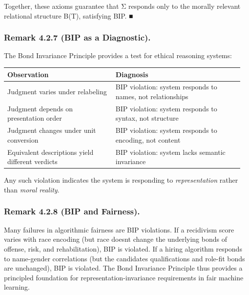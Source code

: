 \documentclass[12pt]{article}
\theoremstyle{plain}
\theoremstyle{definition}
\theoremstyle{remark}
\begin{document}
Together, these axioms guarantee that Σ responds only to the morally
relevant relational structure B(T), satisfying BIP. ■

\subsubsection{\texorpdfstring{Remark 4.2.7 (BIP as a Diagnostic).
}{Remark 4.2.7 (BIP as a Diagnostic). }}\label{remark-4.2.7-bip-as-a-diagnostic.}

The Bond Invariance Principle provides a test for ethical reasoning
systems:

\begin{table}[t]
\centering
\begin{tabular}{p{0.44\linewidth} p{0.52\linewidth}}
\toprule
\textbf{Observation} & \textbf{Diagnosis} \\
\midrule
Judgment varies under relabeling & BIP violation: system responds to
names, not relationships \\
Judgment depends on presentation order & BIP violation: system responds
to syntax, not structure \\
Judgment changes under unit conversion & BIP violation: system responds
to encoding, not content \\
Equivalent descriptions yield different verdicts & BIP violation: system
lacks semantic invariance \\
\bottomrule
\end{tabular}
\end{table}

Any such violation indicates the system is responding to
\emph{representation} rather than \emph{moral reality}.

\subsubsection{\texorpdfstring{Remark 4.2.8 (BIP and Fairness).
}{Remark 4.2.8 (BIP and Fairness). }}\label{remark-4.2.8-bip-and-fairness.}

Many failures in algorithmic fairness are BIP violations. If a
recidivism score varies with race encoding (but race
doesn\textquotesingle t change the underlying bonds of offense, risk,
and rehabilitation), BIP is violated. If a hiring algorithm responds to
name-gender correlations (but the candidate\textquotesingle s
qualifications and role-fit bonds are unchanged), BIP is violated. The
Bond Invariance Principle thus provides a principled foundation for
representation-invariance requirements in fair machine learning.
\end{document}
